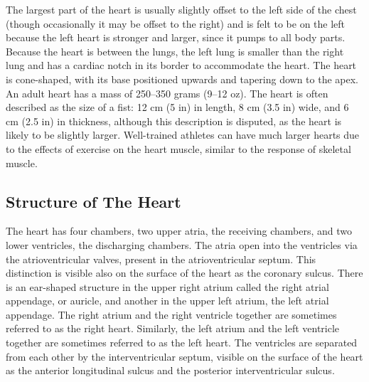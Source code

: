 The largest part of the heart is usually slightly offset to the left side of the chest (though occasionally it may be offset to the right) and is felt to be on the left because the left heart is stronger and larger, since it pumps to all body parts. Because the heart is between the lungs, the left lung is smaller than the right lung and has a cardiac notch in its border to accommodate the heart. The heart is cone-shaped, with its base positioned upwards and tapering down to the apex. An adult heart has a mass of 250--350 grams (9--12 oz). The heart is often described as the size of a fist: 12 cm (5 in) in length, 8 cm (3.5 in) wide, and 6 cm (2.5 in) in thickness, although this description is disputed, as the heart is likely to be slightly larger. Well-trained athletes can have much larger hearts due to the effects of exercise on the heart muscle, similar to the response of skeletal muscle.

\hypertarget{structure-of-the-heart}{%
\subsection{Structure of The Heart}\label{structure-of-the-heart}}

The heart has four chambers, two upper atria, the receiving chambers, and two lower ventricles, the discharging chambers. The atria open into the ventricles via the atrioventricular valves, present in the atrioventricular septum. This distinction is visible also on the surface of the heart as the coronary sulcus. There is an ear-shaped structure in the upper right atrium called the right atrial appendage, or auricle, and another in the upper left atrium, the left atrial appendage. The right atrium and the right ventricle together are sometimes referred to as the right heart. Similarly, the left atrium and the left ventricle together are sometimes referred to as the left heart. The ventricles are separated from each other by the interventricular septum, visible on the surface of the heart as the anterior longitudinal sulcus and the posterior interventricular sulcus.



